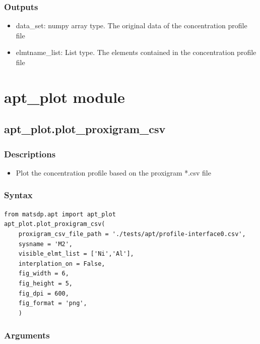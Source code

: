 \documentclass[12pt]{book}
\begin{document}
\subsubsection{Outputs}

\begin{itemize}
\item data\_set: numpy array type. The original data of the concentration profile file
\item elmtname\_list: List type. The elements contained in the concentration profile file
\end{itemize}

\section{apt\_plot module}

\subsection{apt\_plot.plot\_proxigram\_csv}

\subsubsection{Descriptions}
\begin{itemize}
\item Plot the concentration profile based on the proxigram *.csv file
\end{itemize}

\subsubsection{Syntax}
\begin{lstlisting}
from matsdp.apt import apt_plot
apt_plot.plot_proxigram_csv(
    proxigram_csv_file_path = './tests/apt/profile-interface0.csv',
    sysname = 'M2',
    visible_elmt_list = ['Ni','Al'],
    interplation_on = False,
    fig_width = 6,
    fig_height = 5,
    fig_dpi = 600,
    fig_format = 'png',
    )
\end{lstlisting}

\subsubsection{Arguments}
\end{document}

